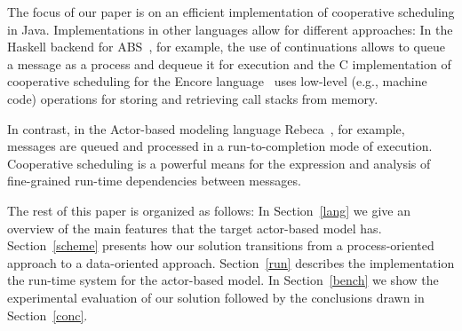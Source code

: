 The focus of our paper is on an efficient implementation of cooperative scheduling in Java.
Implementations in other languages allow for different approaches:
In the Haskell backend for ABS~\cite{Haskell}, for example, the use of continuations allows
to queue a message as a process and dequeue it for execution and the C implementation of cooperative scheduling for the
Encore language~\cite{Encore} uses low-level (e.g., machine code) operations for
storing and retrieving call stacks from memory.

In contrast, in the Actor-based modeling language Rebeca~\cite{Sirjani}, for example,
messages are queued and processed in a run-to-completion mode of execution.
Cooperative scheduling is a powerful means for the expression and analysis
of fine-grained run-time dependencies between messages.

The rest of this paper is organized as follows: In Section~\ref{lang} we give an overview of the main features that the target actor-based model has. Section~\ref{scheme} presents how our solution transitions from a process-oriented approach to a data-oriented approach. Section~\ref{run} describes the implementation the run-time system for the actor-based model. In Section~\ref{bench} we show the experimental evaluation of our solution followed by the conclusions drawn in Section~\ref{conc}.






